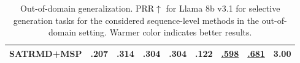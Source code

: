 \begin{table}[t]
{\begin{tabular}{l||cc|cc|c|c|c|c}
SATRMD+MSP & \large\cellcolor[rgb]{0.8594926464901961,0.905996446872549,0.9888280806960784} .207 & \large\cellcolor[rgb]{0.852836579,0.50777808,0.575116406} \textbf{.314} & \large\cellcolor[rgb]{0.852836579,0.50777808,0.575116406} \textbf{.304} & \large\cellcolor[rgb]{0.9460687713941176,0.7126943685490196,0.6666446363803922} .304 & \large\cellcolor[rgb]{0.8840171821764706,0.9185176097647059,0.976244109117647} .122 & \large\cellcolor[rgb]{0.9102005491941176,0.643382456317647,0.6225797599} \underline{.598} & \large\cellcolor[rgb]{0.9218513348607843,0.6650340647294117,0.635032405109804} \underline{.681} & \large\cellcolor[rgb]{0.9774267028058823,0.7958111725039216,0.7356687317450981} 3.00 \\
\bottomrule
\end{tabular}
}\caption{\label{tab:llama_gen_results}  Out-of-domain generalization. PRR$\uparrow$ for Llama 8b v3.1 for selective generation tasks for the considered sequence-level methods in the out-of-domain setting. Warmer color indicates better results.}\end{table}